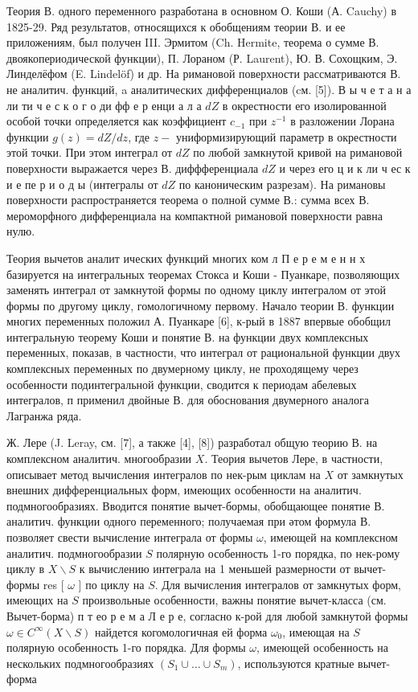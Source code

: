 \documentclass[10pt]{article}
\begin{document}
Теория В. одного переменного разработана в основном О. Коши (А. Cauchy) в 1825-29. Ряд результатов, относящихся к обобщениям теории В. и ее приложениям, был получен III. Эрмитом (Ch. Hermite, теорема о сумме В. двоякопериодической функции), П. Лораном (Р. Laurent), Ю. В. Сохощким, Э. Линделёфом (E. Lindelöf) и др. На римановой поверхности рассматриваются В. не аналитич. функций, a аналитических дифференциалов (cм. [5]). В ы ч е т а н а ли ти ч е с к о г о ди фф е р енци а л а $d Z$ в окрестности его изолированной особой точки определяется как коэффициент $c_{-1}$ при $z^{-1}$ в разложении Лорана функции $g(z)=d Z / d z$, где $z-$ униформизирующий параметр в окрестности этой точки. При этом интеграл от $d Z$ по любой замкнутой кривой на римановой поверхности выражается через В. диффференциала $d Z$ и через его ц и к ли ч ес к и е пе р и о д ы (интегралы от $d Z$ по каноническим разрезам). На римановы поверхности распространяется теорема о полной сумме В.: сумма всех В. мероморфного дифференциала на компактной римановой поверхности равна нулю.



Теория вычетов аналит ических функций многих ком л П е р е м е н н х базируется на интегральных теоремах Стокса и Коши - Пуанкаре, позволяющих заменять интеграл от замкнутой формы по одному циклу интегралом от этой формы по другому циклу, гомологичному первому. Начало теории В. функции многих переменных положил А. Пуанкаре [6], к-рый в 1887 впервые обобщил интегральную теорему Коши и понятие В. на функции двух комплексных переменных, показав, в частности, что интеграл от рациональной функции двух комплексных переменных по двумерному циклу, не проходящему через особенности подинтегральной функции, сводится к периодам абелевых интегралов, п применил двойные В. для обоснования двумерного аналога Лагранжа ряда.



Ж. Лере (J. Leray, см. [7], а также [4], [8]) разработал общую теорию В. на комплексном аналитич. многообразии $X$. Теория вычетов Лере, в частности, описывает метод вычисления интегралов по нек-рым циклам на $X$ от замкнутых внешних дифференциальных форм, имеющих особенности на аналитич. подмногообразиях. Вводится понятие вычет-бормы, обобщающее понятие В. аналитич. функции одного переменного; получаемая при әтом формула В. позволяет свести вычисление интеграла от формы $\omega$, имеющей на комплексном аналитич. подмногообразии $S$ полярную особенность 1-го порядка, по нек-рому циклу в $X \backslash S$ к вычислению интеграла на 1 меньшей размерности от вычет-формы res [ $\omega$ ] по циклу на $S$. Для вычисления интегралов от замкнутых форм, имеющих на $S$ произвольные особенности, важны понятие вычет-класса (см. Вычет-борма) п т ео р е м а Л е р е, согласно к-рой для любой замкнутой формы $\omega \in C^{\infty}(X \backslash S)$ найдется когомологичная ей форма $\omega_{0}$, имеющая на $S$ полярную особенность 1-го порядка. Для формы $\omega$, имеющей особенность на нескольких подмногообразиях $\left(S_{1} \cup \ldots \cup S_{m}\right)$, используются кратные вычет-форма
\end{document}
